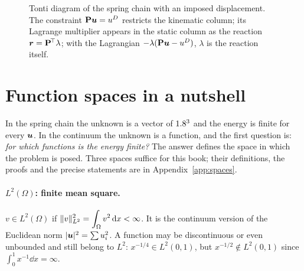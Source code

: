 \begin{figure}[h]
\centering
{}
\caption{Tonti diagram of the spring chain with an imposed displacement. The
constraint $\mathbf{P}\bm{u}=u^{D}$ restricts the kinematic column; its Lagrange
multiplier appears in the static column as the reaction
$\bm{r}=\mathbf{P}^{\!\top}\lambda$; with the Lagrangian $-\lambda(\mathbf{P}\bm{u}-u^{D})$,
$\lambda$ is the reaction itself.}
\label{fig:tonti-constraint}
\end{figure}


\section{Function spaces in a nutshell}\label{sec:var-spaces}
%
In the spring chain the unknown is a vector of $1.8^3$ and the energy is
finite for every $\bm{u}$. In the continuum the unknown is a function, and the
first question is: \emph{for which functions is the energy finite?} The
answer defines the space in which the problem is posed. Three spaces suffice
for this book; their definitions, the proofs and the precise statements are
in Appendix~\ref{app:spaces}.

\paragraph{$L^2(\Omega)$: finite mean square.}
%
$v\in L^2(\Omega)$ if $\displaystyle \lVert v\rVert_{L^2}^2=\int_\Omega v^2\,\mathrm{d} x<\infty$. It is the
continuum version of the Euclidean norm $|\bm{u}|^2=\sum u_i^2$. A function may be
discontinuous or even unbounded and still belong to $L^2$:
$x^{-1/4}\in L^2(0,1)$, but $x^{-1/2}\notin L^2(0,1)$ since
$\displaystyle \int_0^1x^{-1}\dd x=\infty$.

